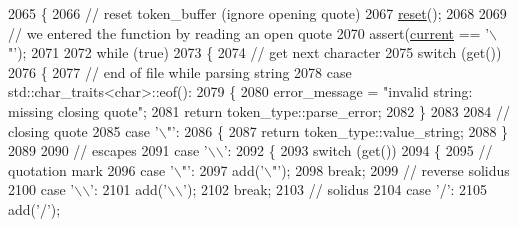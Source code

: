 \begin{DoxyCode}
2065     \{
2066         \textcolor{comment}{// reset token\_buffer (ignore opening quote)}
2067         \hyperlink{classnlohmann_1_1detail_1_1lexer_acba34bc18af19f93186e682d02c3942d}{reset}();
2068 
2069         \textcolor{comment}{// we entered the function by reading an open quote}
2070         assert(\hyperlink{classnlohmann_1_1detail_1_1lexer_a47169f9aaf0da4c9885e61d3109859aa}{current} == \textcolor{charliteral}{'\(\backslash\)"'});
2071 
2072         \textcolor{keywordflow}{while} (\textcolor{keyword}{true})
2073         \{
2074             \textcolor{comment}{// get next character}
2075             \textcolor{keywordflow}{switch} (\textcolor{keyword}{get}())
2076             \{
2077                 \textcolor{comment}{// end of file while parsing string}
2078                 \textcolor{keywordflow}{case} std::char\_traits<char>::eof():
2079                 \{
2080                     error\_message = \textcolor{stringliteral}{"invalid string: missing closing quote"};
2081                     \textcolor{keywordflow}{return} token\_type::parse\_error;
2082                 \}
2083 
2084                 \textcolor{comment}{// closing quote}
2085                 \textcolor{keywordflow}{case} \textcolor{charliteral}{'\(\backslash\)"'}:
2086                 \{
2087                     \textcolor{keywordflow}{return} token\_type::value\_string;
2088                 \}
2089 
2090                 \textcolor{comment}{// escapes}
2091                 \textcolor{keywordflow}{case} \textcolor{charliteral}{'\(\backslash\)\(\backslash\)'}:
2092                 \{
2093                     \textcolor{keywordflow}{switch} (\textcolor{keyword}{get}())
2094                     \{
2095                         \textcolor{comment}{// quotation mark}
2096                         \textcolor{keywordflow}{case} \textcolor{charliteral}{'\(\backslash\)"'}:
2097                             add(\textcolor{charliteral}{'\(\backslash\)"'});
2098                             \textcolor{keywordflow}{break};
2099                         \textcolor{comment}{// reverse solidus}
2100                         \textcolor{keywordflow}{case} \textcolor{charliteral}{'\(\backslash\)\(\backslash\)'}:
2101                             add(\textcolor{charliteral}{'\(\backslash\)\(\backslash\)'});
2102                             \textcolor{keywordflow}{break};
2103                         \textcolor{comment}{// solidus}
2104                         \textcolor{keywordflow}{case} \textcolor{charliteral}{'/'}:
2105                             add(\textcolor{charliteral}{'/'});

\end{DoxyCode}
